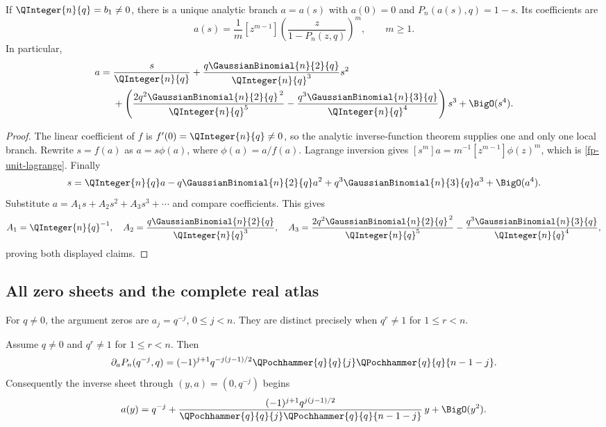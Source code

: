 \begin{theorem}[All-order argument inverse at \(y=1\)]
\label{fp-unit-inverse}
If \(\QInteger{n}{q}=b_1\ne0\), there is a unique analytic branch \(a=a(s)\) with
\(a(0)=0\) and \(P_n(a(s),q)=1-s\).  Its coefficients are
\begin{equation}
 [s^m]a(s)=\frac1m[z^{m-1}]
 \left(\frac{z}{1-P_n(z,q)}\right)^m,
 \qquad m\geq1.
 \label{fp-unit-lagrange}
\end{equation}
In particular,
\begin{align}
 a={}&\frac{s}{\QInteger{n}{q}}
 +\frac{q\GaussianBinomial{n}{2}{q}}{\QInteger{n}{q}^3}s^2 \notag\\
 &+\left(
 \frac{2q^2\GaussianBinomial{n}{2}{q}^{\,2}}{\QInteger{n}{q}^5}
 -\frac{q^3\GaussianBinomial{n}{3}{q}}{\QInteger{n}{q}^4}
 \right)s^3+\BigO(s^4).
 \label{fp-unit-first-terms}
\end{align}
\end{theorem}

\begin{proof}
The linear coefficient of \(f\) is \(f'(0)=\QInteger{n}{q}\ne0\), so the analytic
inverse-function theorem supplies one and only one local branch.  Rewrite
\(s=f(a)\) as \(a=s\phi(a)\), where \(\phi(a)=a/f(a)\).  Lagrange inversion
gives \([s^m]a=m^{-1}[z^{m-1}]\phi(z)^m\), which is
\cref{fp-unit-lagrange}.  Finally
\[
 s=\QInteger{n}{q}a-q\GaussianBinomial{n}{2}{q}a^2
   +q^3\GaussianBinomial{n}{3}{q}a^3+\BigO(a^4).
\]
Substitute \(a=A_1s+A_2s^2+A_3s^3+\cdots\) and compare coefficients.  This
gives
\[
 A_1=\QInteger{n}{q}^{-1},\quad
 A_2=\frac{q\GaussianBinomial{n}{2}{q}}{\QInteger{n}{q}^3},\quad
 A_3=\frac{2q^2\GaussianBinomial{n}{2}{q}^{\,2}}{\QInteger{n}{q}^5}
       -\frac{q^3\GaussianBinomial{n}{3}{q}}{\QInteger{n}{q}^4},
\]
proving both displayed claims.
\end{proof}

\subsection{All zero sheets and the complete real atlas}

For \(q\ne0\), the argument zeros are \(a_j=q^{-j}\), \(0\leq j<n\).
They are distinct precisely when \(q^r\ne1\) for \(1\leq r<n\).

\begin{proposition}
\label{fp-zero-normalization}
Assume \(q\ne0\) and \(q^r\ne1\) for \(1\leq r<n\).  Then
\begin{equation}
 \partial_aP_n(q^{-j},q)=
 (-1)^{j+1}q^{-j(j-1)/2}
 \QPochhammer{q}{q}{j}\QPochhammer{q}{q}{n-1-j}.
 \label{fp-zero-derivative}
\end{equation}
Consequently the inverse sheet through \((y,a)=(0,q^{-j})\) begins
\begin{equation}
 a(y)=q^{-j}+
 \frac{(-1)^{j+1}q^{j(j-1)/2}}
 {\QPochhammer{q}{q}{j}\QPochhammer{q}{q}{n-1-j}}\,y+\BigO(y^2).
 \label{fp-zero-inverse}
\end{equation}
\end{proposition}

